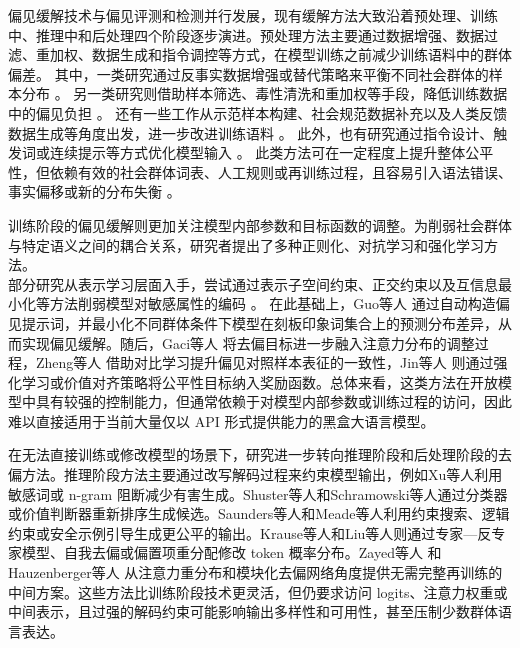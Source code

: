 偏见缓解技术与偏见评测和检测并行发展，现有缓解方法大致沿着预处理、训练中、推理中和后处理四个阶段逐步演进。预处理方法主要通过数据增强、数据过滤、重加权、数据生成和指令调控等方式，在模型训练之前减少训练语料中的群体偏差。
其中，一类研究通过反事实数据增强或替代策略来平衡不同社会群体的样本分布 \cite{DBLP:conf/birthday/LuMWAD20,DBLP:conf/emnlp/MaudslayGCT19,DBLP:conf/acl/GhanbarzadehHPM23}。
另一类研究则借助样本筛选、毒性清洗和重加权等手段，降低训练数据中的偏见负担 \cite{DBLP:conf/ijcnlp/GarimellaMA22,DBLP:journals/corr/abs-2205-11374,DBLP:conf/acl/ThakurJVLM23,DBLP:journals/corr/abs-2108-07790,DBLP:conf/nips/SattigeriGPDV22}。
还有一些工作从示范样本构建、社会规范数据补充以及人类反馈数据生成等角度出发，进一步改进训练语料 \cite{DBLP:conf/emnlp/DinanFWUKW20, DBLP:conf/nips/SolaimanD21, DBLP:conf/emnlp/0002YJLKKCS22, DBLP:conf/acl/UngXB22, DBLP:conf/acl/0012ZMWLCW0H23}。
此外，也有研究通过指令设计、触发词或连续提示等方式优化模型输入 \cite{DBLP:journals/corr/abs-2212-10678, DBLP:conf/eacl/VenkitGPHW23, DBLP:conf/aies/AbidF021, DBLP:conf/acl/FatemiXLX23}。
此类方法可在一定程度上提升整体公平性，但依赖有效的社会群体词表、人工规则或再训练过程，且容易引入语法错误、事实偏移或新的分布失衡 \cite{DBLP:conf/eacl/KumarBNAT23, DBLP:conf/fat/DevinneyBB22}。

训练阶段的偏见缓解则更加关注模型内部参数和目标函数的调整。为削弱社会群体与特定语义之间的耦合关系，研究者提出了多种正则化、对抗学习和强化学习方法。\\
部分研究从表示学习层面入手，尝试通过表示子空间约束、正交约束以及互信息最小化等方法削弱模型对敏感属性的编码 \cite{DBLP:conf/acl/RavfogelEGTG20, DBLP:conf/acl/LiangLZLSM20, DBLP:conf/icassp/WooNJL23}。
在此基础上，Guo等人\cite{DBLP:conf/acl/GuoYA22} 通过自动构造偏见提示词，并最小化不同群体条件下模型在刻板印象词集合上的预测分布差异，从而实现偏见缓解。随后，Gaci等人 \cite{DBLP:conf/emnlp/GaciBCB22} 将去偏目标进一步融入注意力分布的调整过程，Zheng等人 \cite{DBLP:conf/acl/ZhengK0H23} 借助对比学习提升偏见对照样本表征的一致性，Jin等人 \cite{DBLP:conf/naacl/JinBKDNR21} 则通过强化学习或价值对齐策略将公平性目标纳入奖励函数。总体来看，这类方法在开放模型中具有较强的控制能力，但通常依赖于对模型内部参数或训练过程的访问，因此难以直接适用于当前大量仅以 API 形式提供能力的黑盒大语言模型。

在无法直接训练或修改模型的场景下，研究进一步转向推理阶段和后处理阶段的去偏方法。推理阶段方法主要通过改写解码过程来约束模型输出，例如Xu等人\cite{DBLP:journals/corr/abs-2010-07079}利用敏感词或 n-gram 阻断减少有害生成。Shuster等人\cite{DBLP:journals/corr/abs-2208-03188}和Schramowski等人\cite{DBLP:journals/natmi/SchramowskiTARK22}通过分类器或价值判断器重新排序生成候选。Saunders等人\cite{DBLP:conf/acl/SaundersSB22}和Meade等人\cite{DBLP:conf/emnlp/MeadeGHGJRLH23}利用约束搜索、逻辑约束或安全示例引导生成更公平的输出。Krause等人\cite{DBLP:conf/emnlp/KrauseGMKJSR21}和Liu等人\cite{DBLP:conf/acl/LiuKW23}则通过专家—反专家模型、自我去偏或偏置项重分配修改 token 概率分布。Zayed等人\cite{DBLP:journals/corr/abs-2305-13088} 和 Hauzenberger等人\cite{DBLP:conf/acl/HauzenbergerMKS23} 从注意力重分布和模块化去偏网络角度提供无需完整再训练的中间方案。这些方法比训练阶段技术更灵活，但仍要求访问 logits、注意力权重或中间表示，且过强的解码约束可能影响输出多样性和可用性，甚至压制少数群体语言表达。

